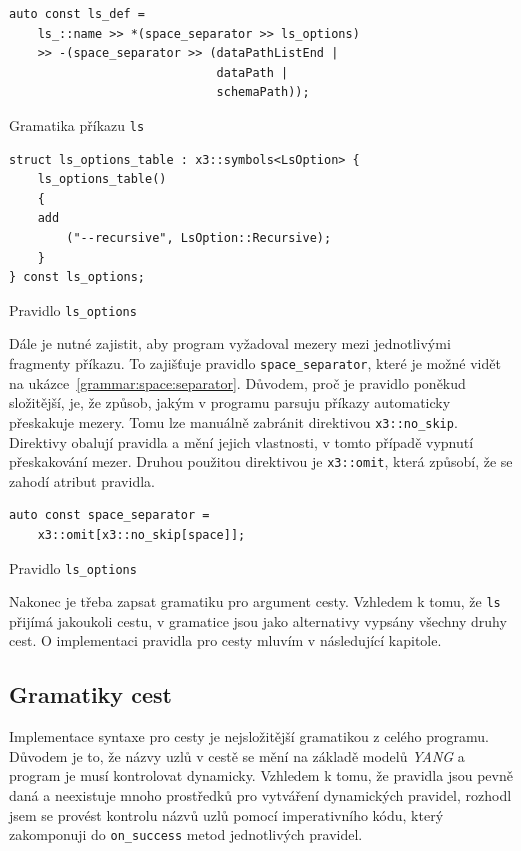 \documentclass[thesis=B,czech,hidelinks]{FITthesis}[2019/03/06]
\begin{document}
\begin{listing}
\begin{verbatim}
auto const ls_def =
    ls_::name >> *(space_separator >> ls_options)
    >> -(space_separator >> (dataPathListEnd |
                             dataPath |
                             schemaPath));
\end{verbatim}
\caption{Gramatika příkazu \texttt{ls}}\label{grammar:ls}
\end{listing}


\begin{listing}
\begin{verbatim}
struct ls_options_table : x3::symbols<LsOption> {
    ls_options_table()
    {
    add
        ("--recursive", LsOption::Recursive);
    }
} const ls_options;
\end{verbatim}
\caption{Pravidlo \texttt{ls\_options}}\label{grammar:ls:options}
\end{listing}

Dále je nutné zajistit, aby program vyžadoval mezery mezi jednotlivými fragmenty příkazu. To zajišťuje pravidlo \verb¨space_separator¨, které je možné vidět na ukázce~\ref{grammar:space:separator}. Důvodem, proč je pravidlo poněkud složitější, je, že způsob, jakým v programu parsuju příkazy automaticky přeskakuje mezery. Tomu lze manuálně zabránit direktivou \verb¨x3::no_skip¨. Direktivy obalují pravidla a mění jejich vlastnosti, v tomto případě vypnutí přeskakování mezer. Druhou použitou direktivou je \verb¨x3::omit¨, která způsobí, že se zahodí atribut pravidla.

\begin{listing}
\begin{verbatim}
auto const space_separator =
    x3::omit[x3::no_skip[space]];
\end{verbatim}
\caption{Pravidlo \texttt{ls\_options}}\label{grammar:space:separator}
\end{listing}

Nakonec je třeba zapsat gramatiku pro argument cesty. Vzhledem k tomu, že \texttt{ls} přijímá jakoukoli cestu, v gramatice jsou jako alternativy vypsány všechny druhy cest. O implementaci pravidla pro cesty mluvím v následující kapitole.

\subsection{Gramatiky cest}
Implementace syntaxe pro cesty je nejsložitější gramatikou z celého programu. Důvodem je to, že názvy uzlů v cestě se mění na základě modelů \textit{YANG} a program je musí kontrolovat dynamicky. Vzhledem k tomu, že pravidla jsou pevně daná a neexistuje mnoho prostředků pro vytváření dynamických pravidel, rozhodl jsem se provést kontrolu názvů uzlů pomocí imperativního kódu, který zakomponuji do \verb¨on_success¨ metod jednotlivých pravidel.
\end{document}
